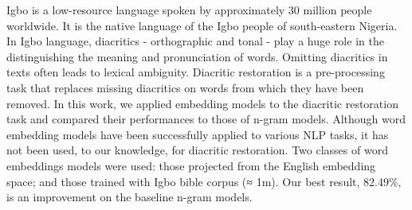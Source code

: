 Igbo is a low-resource language spoken by approximately 30 million people worldwide. It is the native language of the Igbo people of south-eastern Nigeria. In Igbo language, diacritics - orthographic and tonal - play a huge role in the distinguishing the meaning and pronunciation of words. Omitting diacritics in texts often leads to lexical ambiguity. Diacritic restoration is a pre-processing task that replaces missing diacritics on words from which they have been removed. In this work, we applied embedding models to the diacritic restoration task and compared their performances to those of n-gram models. Although word embedding models have been successfully applied to various NLP tasks, it has not been used, to our knowledge, for diacritic restoration. Two classes of word embeddings models were used: those projected from the English embedding space; and those trained with Igbo bible corpus (≈ 1m). Our best result, 82.49\%, is an improvement on the baseline n-gram models.
